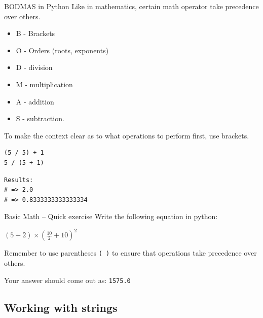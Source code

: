 \documentclass[10pt]{beamer}
\begin{document}
\begin{frame}[label={sec:org9d95d7a},fragile]{BODMAS in Python}
 Like in mathematics, certain math operator take precedence over others.

\begin{itemize}
\item B - Brackets
\item O - Orders (roots, exponents)
\item D - division
\item M - multiplication
\item A - addition
\item S - subtraction.
\end{itemize}

To make the context clear as to what operations to perform first, use brackets.

\begin{verbatim}
(5 / 5) + 1
5 / (5 + 1)
\end{verbatim}

\begin{verbatim}
Results: 
# => 2.0
# => 0.8333333333333334
\end{verbatim}
\end{frame}

\begin{frame}[label={sec:orge949981},fragile]{Basic Math -- Quick exercise}
 Write the following equation in python:

\((5 + 2) \times (\frac{10}{2} + 10)^2\)

\alert{Remember} to use parentheses \texttt{( )} to ensure that operations take precedence over
others.

Your answer should come out as: \texttt{1575.0}
\end{frame}

\subsection{Working with strings}
\label{sec:org1525e19}
\end{document}
